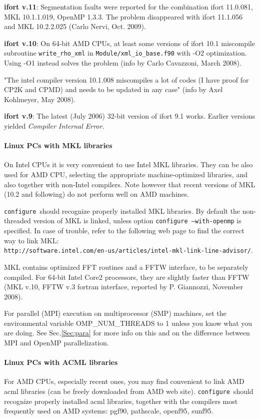 \documentclass[12pt,a4paper]{article}
\def\configure{\texttt{configure}}
\begin{document}
{\bf ifort v.11}: Segmentation faults were reported for the combination 
ifort 11.0.081, MKL 10.1.1.019, OpenMP 1.3.3. The problem disappeared
with ifort 11.1.056 and MKL 10.2.2.025 (Carlo Nervi, Oct. 2009).

{\bf ifort v.10}: On 64-bit AMD CPUs, at least some versions of ifort 10.1 
miscompile subroutine \texttt{write\_rho\_xml} in 
\texttt{Module/xml\_io\_base.f90} with -O2
optimization. Using -O1 instead solves the problem (info by Carlo
Cavazzoni, March 2008). 

"The intel compiler version 10.1.008 miscompiles a lot of codes (I have proof 
for CP2K and CPMD) and needs to be updated in any case" (info by Axel
Kohlmeyer, May 2008).
 
{\bf ifort v.9}: The latest (July 2006) 32-bit version of ifort 9.1
works. Earlier versions yielded {\em Compiler Internal Error}.
    
\paragraph{Linux PCs with MKL libraries}
On Intel CPUs it is very convenient to use Intel MKL libraries. They can be
also used for AMD CPU, selecting the appropriate machine-optimized
libraries, and also together with non-Intel compilers. Note however
that recent versions of MKL (10.2 and following) do not perform
well on AMD machines.

\configure\ should recognize properly installed MKL libraries.
By default the non-threaded version of MKL is linked, unless option
\texttt{configure --with-openmp} is specified. In case of trouble,
refer to the following web page to find the correct way to link MKL:\\
\texttt{http://software.intel.com/en-us/articles/intel-mkl-link-line-advisor/}.

MKL contains optimized FFT routines and a FFTW interface, to be separately
compiled. For 64-bit Intel Core2 processors, they are slightly faster than 
FFTW (MKL v.10, FFTW v.3 fortran interface, reported by P. Giannozzi,
November 2008). 

For parallel (MPI) execution on multiprocessor (SMP) machines, set the
environmental variable OMP\_NUM\_THREADS to 1 unless you know what you 
are doing. See Sec.\ref{Sec:para} for more info on this
and on the difference between MPI and OpenMP parallelization. 

\paragraph{Linux PCs with ACML libraries}
For AMD CPUs, especially recent ones, you may find convenient to 
link AMD acml libraries (can be freely downloaded from AMD web site). 
\configure\ should recognize properly installed acml libraries,
together with the compilers most frequently used on AMD systems:
pgf90, pathscale, openf95, sunf95.
\end{document}
